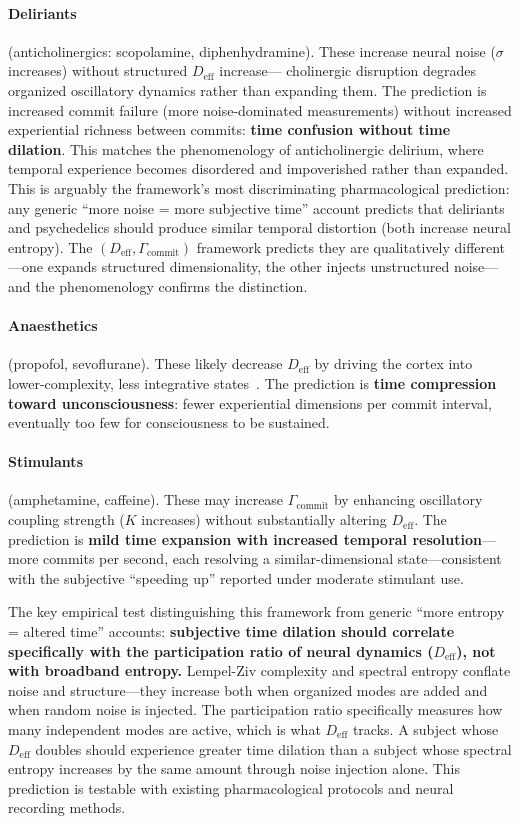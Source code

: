 \documentclass[12pt]{article}
\newcommand{\Deff}{D_{\mathrm{eff}}}
\begin{document}
\paragraph{Deliriants} (anticholinergics: scopolamine, diphenhydramine).
These increase neural noise ($\sigma$ increases) without structured $\Deff$ increase---
cholinergic disruption degrades organized oscillatory dynamics rather than expanding them.
The prediction is increased commit failure (more noise-dominated measurements) without
increased experiential richness between commits: \textbf{time confusion without time
dilation}. This matches the phenomenology of anticholinergic delirium, where temporal
experience becomes disordered and impoverished rather than expanded.
This is arguably the framework's most discriminating pharmacological prediction: any
generic ``more noise = more subjective time'' account predicts that deliriants and
psychedelics should produce similar temporal distortion (both increase neural entropy).
The $(\Deff, \Gamma_{\mathrm{commit}})$ framework predicts they are qualitatively
different---one expands structured dimensionality, the other injects unstructured noise---
and the phenomenology confirms the distinction.

\paragraph{Anaesthetics} (propofol, sevoflurane).
These likely decrease $\Deff$ by driving the cortex into lower-complexity, less integrative
states~\cite{casali2013}. The prediction is
\textbf{time compression toward unconsciousness}: fewer experiential dimensions per
commit interval, eventually too few for consciousness to be sustained.

\paragraph{Stimulants} (amphetamine, caffeine).
These may increase $\Gamma_{\mathrm{commit}}$ by enhancing oscillatory coupling strength
($K$ increases) without substantially altering $\Deff$. The prediction is
\textbf{mild time expansion with increased temporal resolution}---more commits per
second, each resolving a similar-dimensional state---consistent with the subjective
``speeding up'' reported under moderate stimulant use.

\medskip
The key empirical test distinguishing this framework from generic ``more entropy = altered
time'' accounts: \textbf{subjective time dilation should correlate specifically with the
participation ratio of neural dynamics ($\Deff$), not with broadband entropy.}
Lempel-Ziv complexity and spectral entropy conflate noise and structure---they increase
both when organized modes are added and when random noise is injected. The participation
ratio specifically measures how many independent modes are active, which is what $\Deff$
tracks. A subject whose $\Deff$ doubles should experience greater time dilation than a
subject whose spectral entropy increases by the same amount through noise injection
alone. This prediction is testable with existing pharmacological protocols and
neural recording methods.
\end{document}
